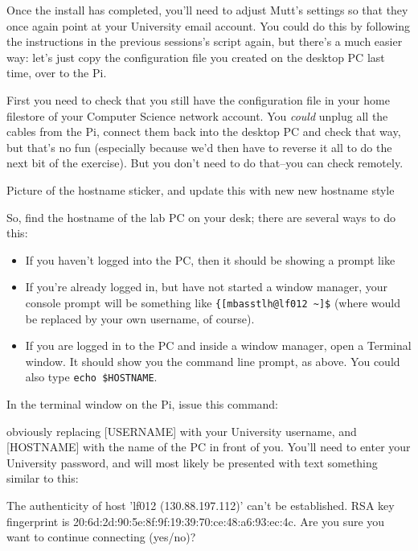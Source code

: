 Once the install has completed, you'll need to adjust Mutt's settings so that they once again point at your University email account. You could do this by following the instructions in the previous sessions's script again, but there's a much easier way: let's just copy the configuration file you created on the desktop PC last time, over to the Pi. 

First you need to check that you still have the  configuration file in your home filestore of your Computer Science network account. You \textit{could} unplug all the cables from the Pi, connect them back into the desktop PC and check that way, but that's no fun (especially because we'd then have to reverse it all to do the next bit of the exercise). But you don't need to do that--you can check remotely. 


\begin{note}
Picture of the hostname sticker, and update this with new new hostname style
\end{note}

So, find the hostname of the lab PC on your desk; there are several ways to do this:

\begin{itemize}
\item If you haven't logged into the PC, then it should be showing a prompt like  
\item If you're already logged in, but have not started a window manager, your console prompt will be something like  \verb|{[mbasstlh@lf012 ~]$| (where  would be replaced by your own username, of course).
\item If you are logged in to the PC and inside a window manager, open a Terminal window. It should show you the command line prompt, as above. You could also type \verb|echo $HOSTNAME|.
\end{itemize}

In the terminal window on the Pi, issue this command:


obviously replacing [USERNAME] with your University username, and [HOSTNAME] with the name of the PC in front of you. You'll need to enter your University password, and will most likely be presented with text something similar to this:

\begin{ttoutenv}
The authenticity of host 'lf012 (130.88.197.112)' can't be established.
RSA key fingerprint is 20:6d:2d:90:5e:8f:9f:19:39:70:ce:48:a6:93:ec:4c.
Are you sure you want to continue connecting (yes/no)? 
\end{ttoutenv}

